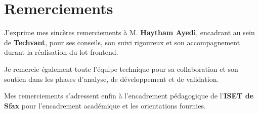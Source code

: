 \chapter*{Remerciements}

J'exprime mes sincères remerciements à M. \textbf{Haytham Ayedi}, encadrant au sein de \textbf{Techvant}, pour ses conseils, son suivi rigoureux et son accompagnement durant la réalisation du lot frontend.

Je remercie également toute l'équipe technique pour sa collaboration et son soutien dans les phases d'analyse, de développement et de validation.

Mes remerciements s'adressent enfin à l'encadrement pédagogique de l'\textbf{ISET de Sfax} pour l'encadrement académique et les orientations fournies.
